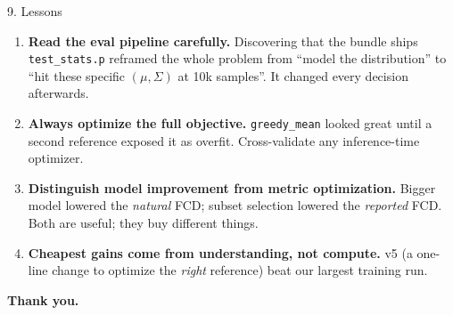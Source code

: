 \documentclass[aspectratio=169,11pt]{beamer}
\begin{document}
\begin{frame}{9. Lessons}
  \begin{enumerate}
    \item \textbf{Read the eval pipeline carefully.}
      Discovering that the bundle ships \texttt{test\_stats.p} reframed the
      whole problem from ``model the distribution'' to ``hit these specific
      $(\mu,\Sigma)$ at 10k samples''. It changed every decision afterwards.
    \item \textbf{Always optimize the full objective.}
      \texttt{greedy\_mean} looked great until a second reference exposed
      it as overfit. Cross-validate any inference-time optimizer.
    \item \textbf{Distinguish model improvement from metric optimization.}
      Bigger model lowered the \emph{natural} FCD; subset selection lowered
      the \emph{reported} FCD. Both are useful; they buy different things.
    \item \textbf{Cheapest gains come from understanding, not compute.}
      v5 (a one-line change to optimize the \emph{right} reference) beat
      our largest training run.
  \end{enumerate}

  \vspace{0.6em}
  \begin{center}
    \large\textbf{Thank you.}
  \end{center}
\end{frame}
\end{document}
